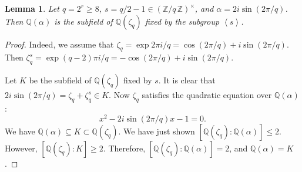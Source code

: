 \documentclass{amsart}[11pt]
\newtheorem{lem}[thm]{Lemma}
\theoremstyle{definition}
\numberwithin{equation}{section}
\theoremstyle{notitle}
\begin{document}
\begin{lem}
  Let $q=2^r\geq 8$, $s=q/2-1\in {(\mathbb{Z}/ {q}\, \mathbb{Z})^\times}$, and $\alpha=
  2i\sin(2\pi/q)$. Then ${\mathbb{Q}}(\alpha)$ is the subfield of ${\mathbb{Q}}(\zeta_q)$
  fixed by the subgroup ${\left\langle {s} \right\rangle}$.
\end{lem}
\begin{proof}
  Indeed, we assume that $\zeta_q= \exp{2\pi i/ q}=\cos (2\pi/q)+i
  \sin(2\pi/q)$.  Then $\zeta_q^s= \exp{(q-2)\pi i/q} =-\cos (2\pi/q)+i
  \sin(2\pi/q)$. 

  Let $K$ be the subfield of ${\mathbb{Q}}(\zeta_q)$ fixed by $s$. It is clear
  that $2i\sin(2\pi/q)= \zeta_q+\zeta_q^s\in K$.
Now $\zeta_q$ satisfies the quadratic equation over
${\mathbb{Q}}(\alpha)$: 
\[ x^2- 2i\sin(2\pi/q) x -1 =0. \]
We have ${\mathbb{Q}}(\alpha)\subseteq K \subset {\mathbb{Q}}(\zeta_q)$. We have just
shown $[{\mathbb{Q}}(\zeta_q): {\mathbb{Q}}(\alpha)]\leq 2$. However,
$[{\mathbb{Q}}(\zeta_q):K]\geq 2$. Therefore, $[{\mathbb{Q}}(\zeta_q): {\mathbb{Q}}(\alpha)]=2$,
and ${\mathbb{Q}}(\alpha)=K$. 
\end{proof}



\end{document}
